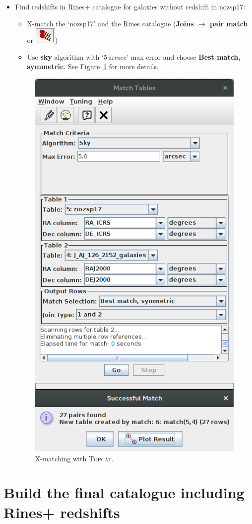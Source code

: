 \documentclass [a4paper, 12pt]{article}
\newcommand{\topcat}{{\textsc{Topcat}}}
\begin{document}
\begin{itemize}
\item Find redshifts in Rines+ catalogue for galaxies without redshift in 
nozsp17:
\begin{itemize}
    \item X-match the `nozsp17' and the Rines catalogue (\textbf{Joins 
    $\rightarrow$ pair match} or  \includegraphics[width=0.04  
    \textwidth]{../images/topcat_button_xmatch.jpg})
    \item Use \textbf{sky} algorithm with `5\,arcsec' max error and choose 
    \textbf{Best match, symmetric}. See Figure~\ref{fig:topcatxmatch} for  more 
    details. 
\end{itemize}

\begin{figure}[H]
\center
\includegraphics[width=0.3  
\textwidth]{../images/topcat_match_SDSS_Rines2003.png}
\caption{X-matching with \topcat.}
\label{fig:topcatxmatch}
\end{figure}
\end{itemize}

\section{Build the final catalogue including Rines+ redshifts}
\end{document}
